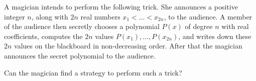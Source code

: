 A magician intends to perform the following trick. She announces a positive integer $n$, along with $2n$ real numbers $x_1 < \ldots < x_{2n}$, to the audience. A member of the audience then secretly chooses a polynomial $P(x)$ of degree $n$ with real coefficients, computes the $2n$ values $P(x_1), \ldots, P(x_{2n})$, and writes down these $2n$ values on the blackboard in non-decreasing order. After that the magician announces the secret polynomial to the audience.

Can the magician find a strategy to perform such a trick?
